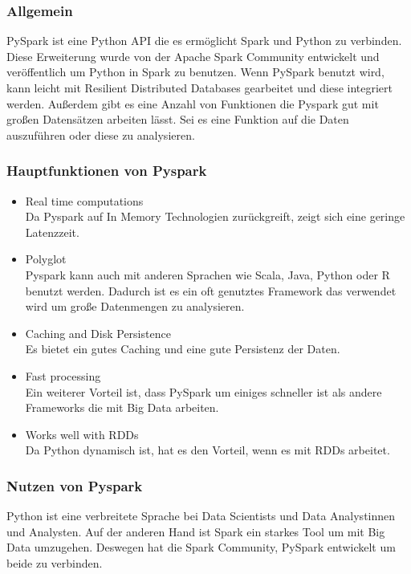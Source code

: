\subsubsection{Allgemein}
PySpark ist eine Python API die es ermöglicht Spark und Python zu verbinden. Diese Erweiterung wurde von der Apache Spark Community entwickelt und veröffentlich um Python in Spark zu benutzen. Wenn PySpark benutzt wird, kann leicht mit Resilient Distributed Databases gearbeitet und diese integriert werden. Außerdem gibt es eine Anzahl von Funktionen die Pyspark gut mit großen Datensätzen arbeiten lässt. Sei es eine Funktion auf die Daten auszuführen oder diese zu analysieren.
\subsubsection{Hauptfunktionen von Pyspark}
\begin{itemize}
\item{Real time computations} \mbox{} \\
Da Pyspark auf In Memory Technologien zurückgreift, zeigt sich eine geringe Latenzzeit.
\item{Polyglot} \mbox{} \\
Pyspark kann auch mit anderen Sprachen wie Scala, Java, Python oder R benutzt werden. Dadurch ist es ein oft genutztes Framework das verwendet wird um große Datenmengen zu analysieren.
\item{Caching and Disk Persistence} \mbox{} \\
Es bietet ein gutes Caching und eine gute Persistenz der Daten.
\item{Fast processing} \mbox{} \\
Ein weiterer Vorteil ist, dass PySpark um einiges schneller ist als andere Frameworks die mit Big Data arbeiten. 
\item{Works well with RDDs} \mbox{} \\
Da Python dynamisch ist, hat es den Vorteil, wenn es mit RDDs arbeitet.
\end{itemize}
\subsubsection{Nutzen von Pyspark}
Python ist eine verbreitete Sprache bei Data Scientists und Data Analystinnen und Analysten. Auf der anderen Hand ist Spark ein starkes Tool um mit Big Data umzugehen. Deswegen hat die Spark Community, PySpark entwickelt um beide zu verbinden.




